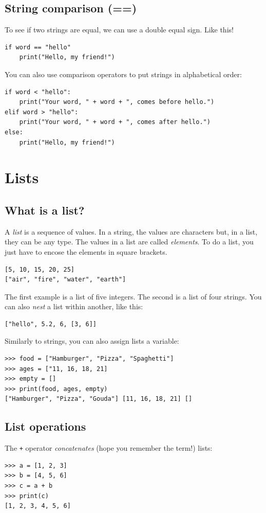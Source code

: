 \subsection{String comparison (==)}
To see if two strings are equal, we can use a double equal sign. Like this!
\begin{verbatim}
if word == "hello"
    print("Hello, my friend!")
\end{verbatim}

You can also use comparison operators to put strings in alphabetical order:
\begin{verbatim}
if word < "hello":
    print("Your word, " + word + ", comes before hello.")
elif word > "hello":
    print("Your word, " + word + ", comes after hello.")
else:
    print("Hello, my friend!")
\end{verbatim}

\section{Lists}
\subsection{What is a list?}
A \textit{list} is a sequence of values. In a string, the values are characters but, in a list, they can be any type. The values in a list are called \textit{elements}. To do a list, you just have to encose the elements in square brackets.
\begin{verbatim}
[5, 10, 15, 20, 25]
["air", "fire", "water", "earth"]
\end{verbatim}

The first example is a list of five integers. The second is a list of four strings. You can also \textit{nest} a list within another, like this:
\begin{verbatim}
["hello", 5.2, 6, [3, 6]]
\end{verbatim}

Similarly to strings, you can also assign lists a variable:
\begin{verbatim}
>>> food = ["Hamburger", "Pizza", "Spaghetti"]
>>> ages = ["11, 16, 18, 21]
>>> empty = []
>>> print(food, ages, empty)
["Hamburger", "Pizza", "Gouda"] [11, 16, 18, 21] []
\end{verbatim}

\subsection{List operations}
The \texttt{+} operator \textit{concatenates} (hope you remember the term!) lists:
\begin{verbatim}
>>> a = [1, 2, 3]
>>> b = [4, 5, 6]
>>> c = a + b
>>> print(c)
[1, 2, 3, 4, 5, 6]
\end{verbatim}

